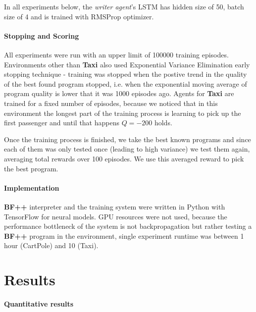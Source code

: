 In all experiments below, the \emph{writer agent}'s LSTM has hidden size of 50, batch size of 4 and is trained with RMSProp \cite{tielemanLectureRmsPropDivide2012} optimizer.

\paragraph{Stopping and Scoring}

All experiments were run with an upper limit of 100000 training episodes.
Environments other than \textbf{Taxi} also used Exponential Variance Elimination \cite{evestop} early stopping technique - training was stopped when the postive trend in the quality of the best found program stopped, i.e. when the exponential moving average of program quality is lower that it was 1000 episodes ago.
Agents for \textbf{Taxi} are trained for a fixed number of episodes, because we noticed that in this environment the longest part of the training process is learning to pick up the first passenger and until that happens $Q=-200$ holds.

Once the training process is finished, we take the best known programs and since each of them was only tested once (leading to high variance) we test them again, averaging total rewards over 100 episodes. 
We use this averaged reward to pick the best program.

\paragraph{Implementation}

\textbf{BF++} interpreter and the training system were written in Python with TensorFlow for neural models.
GPU resources were not used, because the performance bottleneck of the system is not backpropagation but rather testing a \textbf{BF++} program in the environment, single experiment runtime was between 1 hour (CartPole) and 10 (Taxi).

\newpage
\section{Results}

\paragraph{Quantitative results}

